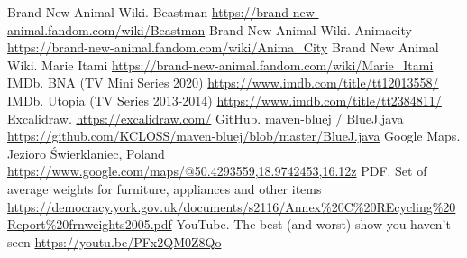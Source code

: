 \documentclass{article}
\begin{document}
    \newpage

    \begin{thebibliography}{9}
        Brand New Animal Wiki. Beastman \url{https://brand-new-animal.fandom.com/wiki/Beastman}
        Brand New Animal Wiki. Animacity \url{https://brand-new-animal.fandom.com/wiki/Anima_City}
        Brand New Animal Wiki. Marie Itami \url{https://brand-new-animal.fandom.com/wiki/Marie_Itami}
        IMDb. BNA (TV Mini Series 2020) \url{https://www.imdb.com/title/tt12013558/}
        IMDb. Utopia (TV Series 2013-2014) \url{https://www.imdb.com/title/tt2384811/}
        Excalidraw. \url{https://excalidraw.com/}
        GitHub. maven-bluej / BlueJ.java \url{https://github.com/KCLOSS/maven-bluej/blob/master/BlueJ.java}
        Google Maps. Jezioro Świerklaniec, Poland \url{https://www.google.com/maps/@50.4293559,18.9742453,16.12z}
        PDF. Set of average weights for furniture, appliances and other items \url{https://democracy.york.gov.uk/documents/s2116/Annex\%20C\%20REcycling\%20Report\%20frnweights2005.pdf}
        YouTube. The best (and worst) show you haven't seen \url{https://youtu.be/PFx2QM0Z8Qo}
    \end{thebibliography}  
    
    \newpage
\end{document}
